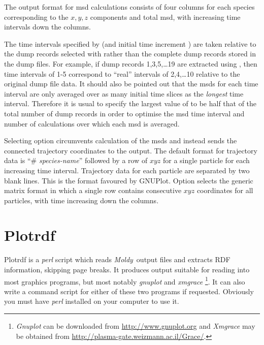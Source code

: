 \documentclass[a4paper,twoside]{report}
\newcommand{\moldy}{\emph{Moldy}}
\begin{document}
The output format for msd calculations consists of four columns for each species
corresponding to the $x, y, z$ components and total msd, with
increasing time intervals down the columns.

The time intervals specified by  (and initial time increment
) are taken relative to the dump records selected with 
rather than the complete dump records stored in the dump files. For
example, if dump records 1,3,5,\ldots{}19 are extracted using , then
time intervals of  1-5 correspond to ``real'' intervals of
2,4,\ldots{}10 relative to the original dump file data. It should also be
pointed out that the msds for each time interval are only averaged
over as many initial time slices as the \emph{longest} time interval.
Therefore it is usual to specify the largest value of  to be
half that of the total number of dump records in order to optimise the
msd time interval and number of calculations over which each msd is
averaged.

Selecting option   circumvents calculation of the msds and
instead sends the connected trajectory coordinates to the output. The
default format for trajectory data is ``\# \textit{species-name}'' followed by a
row of $x y z$ for a single particle for each increasing time interval.
Trajectory data for each particle are separated by two blank lines.
This is the format favoured by GNUPlot. Option   selects
the generic matrix format in which a single row contains consecutive $x
y z$ coordinates for all particles, with time increasing down the
columns.

\section{Plotrdf}%
Plotrdf is a \emph{perl} script which reads \moldy\ output files and
extracts RDF information, skipping page breaks.  It produces output
suitable for reading into most graphics programs, but most notably
\emph{gnuplot} and \emph{xmgrace}%
\footnote{\emph{Gnuplot} can be downloaded from
  \url{http://www.gnuplot.org} and
\emph{Xmgrace} may be obtained from
\url{http://plasma-gate.weizmann.ac.il/Grace/}.}.
It can also write a command script
for either of these two programs if requested.  Obviously you must
have \emph{perl} installed on your computer to use it.
\end{document}
